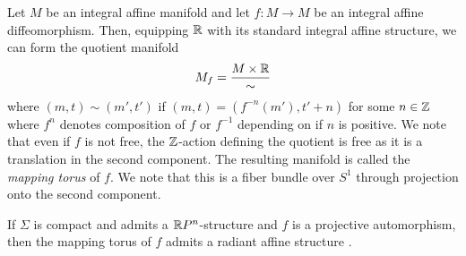 \begin{eg}
    Let $M$ be an integral affine manifold and let $f: M \to M$ be an integral affine diffeomorphism. Then, equipping $\mathbb{R}$ with its
    standard integral affine structure, we can form the quotient manifold
    $$
        M_f = \dfrac{M \times \mathbb{R}}{\sim}
    $$
    where $(m,t) \sim (m', t')$ if $(m,t) = (f^{-n}(m'), t' + n)$ for some $n \in \mathbb{Z}$ where $f^n$ denotes composition of $f$ or $f^{-1}$ depending on if $n$ is positive. We note that even if $f$ is not free,
    the $\mathbb{Z}$-action defining the quotient is free as it is a translation in the second component. The resulting manifold is called the \emph{mapping torus} of $f$. We note that this is a fiber bundle over $S^1$ through projection
    onto the second component.
\end{eg}
\begin{remark}
    If $\Sigma$ is compact and admits a $\mathbb{R} P^n$-structure and $f$ is a projective automorphism, then the mapping torus of $f$ admits a radiant affine structure \cite{goldman2022geometric}.
\end{remark}
